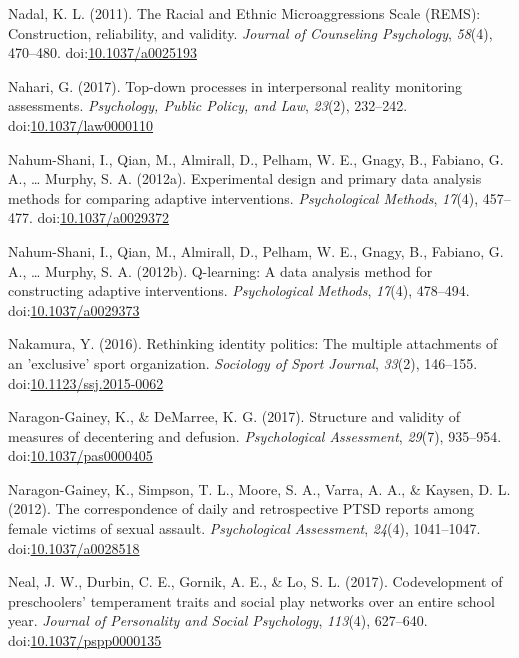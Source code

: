 \documentclass[english,man]{apa6}
\theoremstyle{definition}
\theoremstyle{definition}
\theoremstyle{definition}
\theoremstyle{remark}
\begin{document}
\hypertarget{ref-Nadal2011}{}
Nadal, K. L. (2011). The Racial and Ethnic Microaggressions Scale
(REMS): Construction, reliability, and validity. \emph{Journal of
Counseling Psychology}, \emph{58}(4), 470--480.
doi:\href{https://doi.org/10.1037/a0025193}{10.1037/a0025193}

\hypertarget{ref-Nahari2017}{}
Nahari, G. (2017). Top-down processes in interpersonal reality
monitoring assessments. \emph{Psychology, Public Policy, and Law},
\emph{23}(2), 232--242.
doi:\href{https://doi.org/10.1037/law0000110}{10.1037/law0000110}

\hypertarget{ref-Nahum-Shani2012a}{}
Nahum-Shani, I., Qian, M., Almirall, D., Pelham, W. E., Gnagy, B.,
Fabiano, G. A., \ldots{} Murphy, S. A. (2012a). Experimental design and
primary data analysis methods for comparing adaptive interventions.
\emph{Psychological Methods}, \emph{17}(4), 457--477.
doi:\href{https://doi.org/10.1037/a0029372}{10.1037/a0029372}

\hypertarget{ref-Nahum-Shani2012}{}
Nahum-Shani, I., Qian, M., Almirall, D., Pelham, W. E., Gnagy, B.,
Fabiano, G. A., \ldots{} Murphy, S. A. (2012b). Q-learning: A data
analysis method for constructing adaptive interventions.
\emph{Psychological Methods}, \emph{17}(4), 478--494.
doi:\href{https://doi.org/10.1037/a0029373}{10.1037/a0029373}

\hypertarget{ref-Nakamura2016}{}
Nakamura, Y. (2016). Rethinking identity politics: The multiple
attachments of an 'exclusive' sport organization. \emph{Sociology of
Sport Journal}, \emph{33}(2), 146--155.
doi:\href{https://doi.org/10.1123/ssj.2015-0062}{10.1123/ssj.2015-0062}

\hypertarget{ref-Naragon-Gainey2017}{}
Naragon-Gainey, K., \& DeMarree, K. G. (2017). Structure and validity of
measures of decentering and defusion. \emph{Psychological Assessment},
\emph{29}(7), 935--954.
doi:\href{https://doi.org/10.1037/pas0000405}{10.1037/pas0000405}

\hypertarget{ref-Naragon-Gainey2012}{}
Naragon-Gainey, K., Simpson, T. L., Moore, S. A., Varra, A. A., \&
Kaysen, D. L. (2012). The correspondence of daily and retrospective PTSD
reports among female victims of sexual assault. \emph{Psychological
Assessment}, \emph{24}(4), 1041--1047.
doi:\href{https://doi.org/10.1037/a0028518}{10.1037/a0028518}

\hypertarget{ref-Neal2017}{}
Neal, J. W., Durbin, C. E., Gornik, A. E., \& Lo, S. L. (2017).
Codevelopment of preschoolers' temperament traits and social play
networks over an entire school year. \emph{Journal of Personality and
Social Psychology}, \emph{113}(4), 627--640.
doi:\href{https://doi.org/10.1037/pspp0000135}{10.1037/pspp0000135}
\end{document}
